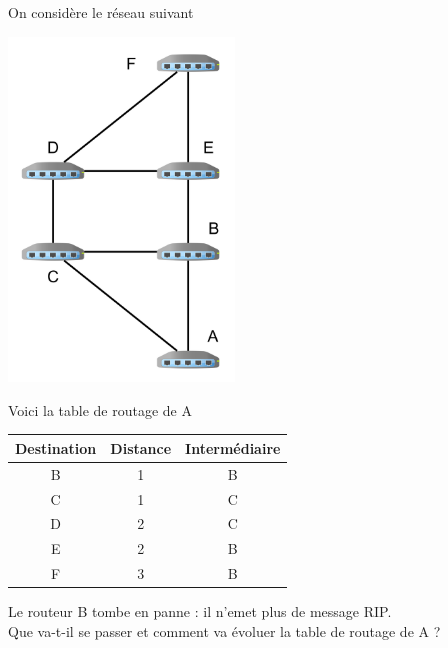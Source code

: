 \documentclass[a4paper,12pt,french]{article}
\begin{document}
\begin{exercice}
	On considère le réseau suivant
	\begin{center}
		\includegraphics[width=6cm]{img/res2.png}
	\end{center}
	
	Voici la table de routage de A
	
\begin{center}
\begin{tabular}{|c|c|c|}
	\hline
\rowcolor{UGLiOrange}	\textbf{\color{white}Destination} & \textbf{\color{white}Distance} & \textbf{\color{white}Intermédiaire} \\	\hline
	B & 1 & B \\
	\hline
	C & 1 & C \\
	\hline
	D & 2 & C \\	\hline
	E & 2 & B \\	\hline
	F & 3 & B \\
	\hline
\end{tabular}

\end{center}
Le routeur B tombe en panne : il n'emet plus de message RIP.\\
Que va-t-il se passer et comment va évoluer la table de routage de A ?
\end{exercice}
\end{document}
